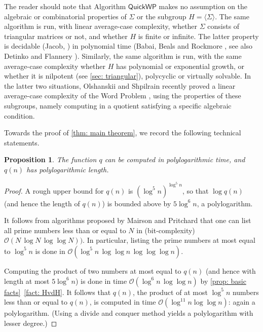 \documentclass{article}
\def\O{\mathcal{O}}
\def\S{\textsf{QuickWP}}
\theoremstyle{plain}
\newtheorem{proposition}[theorem]{Proposition}
\theoremstyle{definition}
\begin{document}
The reader should note that Algorithm $\S$ makes no assumption on the algebraic or combinatorial properties of $\Sigma$ or the subgroup $H = \langle\Sigma\rangle$. The same algorithm is run, with linear average-case complexity, whether $\Sigma$ consists of triangular matrices or not, and whether $H$ is finite or infinite. The latter property is decidable (Jacob, \cite{1978:Jacob}) in polynomial time (Babai, Beals and Rockmore \cite{1993:BabaiBealsRockmore}, see also Detinko and Flannery \cite{2009:DetinkoFlannery}). Similarly, the same algorithm is run, with the same average-case complexity whether $H$ has polynomial or exponential growth, or whether it is nilpotent (see \cref{sec: triangular}), polycyclic or virtually solvable. In the latter two situations, Olshanskii and Shpilrain recently proved a linear average-case complexity of the Word Problem \cite[Theorem 3 and Remark 4]{2025:OlshShp}, using the properties of these subgroups, namely computing in a quotient satisfying a specific algebraic condition. 

Towards the proof of \cref{thm: main theorem}, we record the following technical statements.

\begin{proposition}\label{prop: t polylogarithmic}
    The function $q$ can be computed in polylogarithmic time, and $q(n)$ has polylogarithmic length.
\end{proposition}

\begin{proof}
A rough upper bound for $q(n)$ is $(\log^5 n)^{\log^5 n}$, so that $\log q(n)$ (and hence the length of $q(n)$) is bounded above by $5\log^6n$, a polylogarithm.

It follows from algorithms proposed by Mairson \cite{mairson1977some} and Pritchard \cite{1987:Pritchard} that one can list all prime numbers less than or equal to $N$ in (bit-complexity) $\O(N\, \log N\, \log\log N))$. In particular, listing the prime numbers at most equal to $\log^5n$ is done in $\O(\log^5 n\, \log\log n \,  \log\log\log n)$.


Computing the product of two numbers at most equal to $q(n)$ (and hence with length at most $5 \log^6n$) is done in time $\O(\log^6n\, \log\log n)$ by \cref{prop: basic facts}~\eqref{fact: HvdH}. It follows that $q(n)$, the product of at most $\log^5n$ numbers less than or equal to $q(n)$, is computed in time $\O(\log^{11}n\log\log n)$: again a polylogarithm. (Using a divide and conquer method yields a polylogarithm with lesser degree.)
\end{proof}
\end{document}
